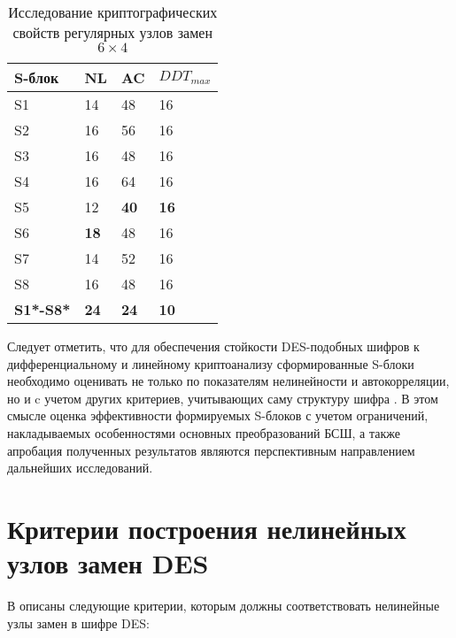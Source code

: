 \begin{table}[ht]
    \caption{Исследование криптографических свойств регулярных узлов замен $6 \times 4$}
    \label{table:sbox_6x4}
    \begin{tabular}{| m{9.25cm} | C{2cm} | C{2cm} | C{2cm} |}
        \hline
        S-блок      & NL        & AC        & $DDT_{max}$ \\ \hline
        S1          & 14        & 48        & 16        \\ \hline
        S2          & 16        & 56        & 16        \\ \hline
        S3          & 16        & 48        & 16        \\ \hline
        S4          & 16        & 64        & 16        \\ \hline
        S5          & 12        & \bf 40    & \bf 16    \\ \hline
        S6          & \bf 18    & 48        & 16        \\ \hline
        S7          & 14        & 52        & 16        \\ \hline
        S8          & 16        & 48        & 16        \\ \hline
        \bf S1*-S8* & \bf 24    & \bf 24    & \bf 10    \\ \hline
    \end{tabular}
\end{table}

Следует отметить, что для обеспечения стойкости DES-подобных шифров к
дифференциальному и линейному криптоанализу сформированные S-блоки необходимо
оценивать не только по показателям нелинейности и автокорреляции, но и c учетом
других критериев, учитывающих саму структуру шифра \cite{Kwangjo}. В этом смысле
оценка эффективности формируемых S-блоков с учетом ограничений, накладываемых
особенностями основных преобразований БСШ, а также апробация полученных
результатов являются перспективным направлением дальнейших исследований.

\section{Критерии построения нелинейных узлов замен DES}
\label{section:des_criteria}

В \cite{Coppersmith} описаны следующие критерии, которым должны соответствовать
нелинейные узлы замен в шифре DES:

